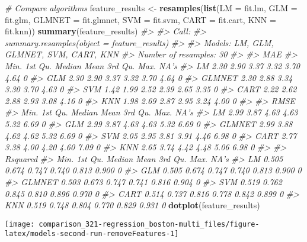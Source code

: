 \documentclass[]{book}
\newenvironment{Shaded}{\begin{snugshade}}{\end{snugshade}}
\newcommand{\CommentTok}[1]{\textcolor[rgb]{0.56,0.35,0.01}{\textit{#1}}}
\newcommand{\DataTypeTok}[1]{\textcolor[rgb]{0.13,0.29,0.53}{#1}}
\newcommand{\KeywordTok}[1]{\textcolor[rgb]{0.13,0.29,0.53}{\textbf{#1}}}
\newcommand{\NormalTok}[1]{#1}
\newcommand{\StringTok}[1]{\textcolor[rgb]{0.31,0.60,0.02}{#1}}
\begin{document}
\begin{Shaded}
\begin{Highlighting}[]
\CommentTok{# Compare algorithms}
\NormalTok{feature_results <-}\StringTok{ }\KeywordTok{resamples}\NormalTok{(}\KeywordTok{list}\NormalTok{(}\DataTypeTok{LM     =}\NormalTok{ fit.lm, }
                                  \DataTypeTok{GLM    =}\NormalTok{ fit.glm, }
                                  \DataTypeTok{GLMNET =}\NormalTok{ fit.glmnet, }
                                  \DataTypeTok{SVM    =}\NormalTok{ fit.svm, }
                                  \DataTypeTok{CART   =}\NormalTok{ fit.cart, }
                                  \DataTypeTok{KNN    =}\NormalTok{ fit.knn))}
\KeywordTok{summary}\NormalTok{(feature_results)}
\CommentTok{#> }
\CommentTok{#> Call:}
\CommentTok{#> summary.resamples(object = feature_results)}
\CommentTok{#> }
\CommentTok{#> Models: LM, GLM, GLMNET, SVM, CART, KNN }
\CommentTok{#> Number of resamples: 30 }
\CommentTok{#> }
\CommentTok{#> MAE }
\CommentTok{#>        Min. 1st Qu. Median Mean 3rd Qu. Max. NA's}
\CommentTok{#> LM     2.30    2.90   3.37 3.32    3.70 4.64    0}
\CommentTok{#> GLM    2.30    2.90   3.37 3.32    3.70 4.64    0}
\CommentTok{#> GLMNET 2.30    2.88   3.34 3.30    3.70 4.63    0}
\CommentTok{#> SVM    1.42    1.99   2.52 2.39    2.65 3.35    0}
\CommentTok{#> CART   2.22    2.62   2.88 2.93    3.08 4.16    0}
\CommentTok{#> KNN    1.98    2.69   2.87 2.95    3.24 4.00    0}
\CommentTok{#> }
\CommentTok{#> RMSE }
\CommentTok{#>        Min. 1st Qu. Median Mean 3rd Qu. Max. NA's}
\CommentTok{#> LM     2.99    3.87   4.63 4.63    5.32 6.69    0}
\CommentTok{#> GLM    2.99    3.87   4.63 4.63    5.32 6.69    0}
\CommentTok{#> GLMNET 2.99    3.88   4.62 4.62    5.32 6.69    0}
\CommentTok{#> SVM    2.05    2.95   3.81 3.91    4.46 6.98    0}
\CommentTok{#> CART   2.77    3.38   4.00 4.20    4.60 7.09    0}
\CommentTok{#> KNN    2.65    3.74   4.42 4.48    5.06 6.98    0}
\CommentTok{#> }
\CommentTok{#> Rsquared }
\CommentTok{#>         Min. 1st Qu. Median  Mean 3rd Qu.  Max. NA's}
\CommentTok{#> LM     0.505   0.674  0.747 0.740   0.813 0.900    0}
\CommentTok{#> GLM    0.505   0.674  0.747 0.740   0.813 0.900    0}
\CommentTok{#> GLMNET 0.503   0.673  0.747 0.741   0.816 0.904    0}
\CommentTok{#> SVM    0.519   0.762  0.845 0.810   0.896 0.970    0}
\CommentTok{#> CART   0.514   0.737  0.816 0.778   0.842 0.899    0}
\CommentTok{#> KNN    0.519   0.748  0.804 0.770   0.829 0.931    0}
\KeywordTok{dotplot}\NormalTok{(feature_results)}
\end{Highlighting}
\end{Shaded}

\begin{center}\texttt{[image: comparison\_321-regression\_boston-multi\_files/figure-latex/models-second-run-removeFeatures-1]} \end{center}
\end{document}
